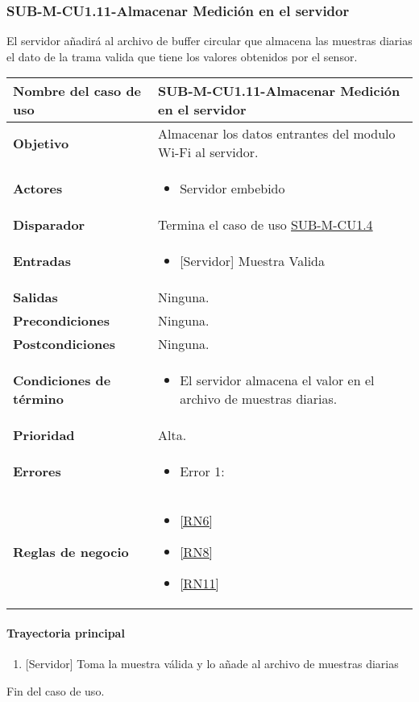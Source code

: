 \subsubsection{SUB-M-CU1.11-Almacenar Medición en el servidor}\label{SUB-M-CU1.11}
El servidor añadirá al archivo de buffer circular que almacena las muestras diarias el dato de la trama valida que tiene los valores obtenidos por el sensor. 

\begin{longtable}{|J{5cm}|J{10.3cm}|}
	\hline
	\textbf{Nombre del caso de uso} &
		SUB-M-CU1.11-Almacenar Medición en el servidor \\ \hline
	\textbf{Objetivo} &
		Almacenar los datos entrantes del modulo Wi-Fi al servidor. \\ \hline
	\textbf{Actores} &
		\begin{itemize}
			\item Servidor embebido
		\end{itemize} \\ \hline
	\textbf{Disparador} & 
	    Termina el caso de uso \hyperref[SUB-M-CU1.4]{SUB-M-CU1.4} \\ \hline 
	\textbf{Entradas} & 
		\begin{itemize}
				\item{[Servidor]} Muestra Valida
		\end{itemize}\\ \hline 
	\textbf{Salidas} & 
        Ninguna. \\ \hline
	\textbf{Precondiciones} &
		Ninguna. \\ \hline
	\textbf{Postcondiciones} &
		Ninguna.\\ \hline
	\textbf{Condiciones de término} & 
		\begin{itemize}
			\item El servidor almacena el valor en el archivo de muestras diarias.
		\end{itemize} \\ \hline 
	\textbf{Prioridad} & 
		Alta. \\ \hline
	\textbf{Errores} & 
		\begin{itemize}
		    \item \label{CU5:Error1} Error 1: 
		\end{itemize} \\ \hline
	\textbf{Reglas de negocio} & 
		\begin{itemize}
		    \item \ref{RN6}
			\item \ref{RN8}
			\item \ref{RN11}
		\end{itemize} \\ \hline

\end{longtable}

\paragraph{Trayectoria principal}
    \label{SUB-M-CU1.5:TP}
	\begin{enumerate}
	    \item {[Servidor]} Toma la muestra válida y lo añade al archivo de muestras diarias
	\end{enumerate}
	Fin del caso de uso.
